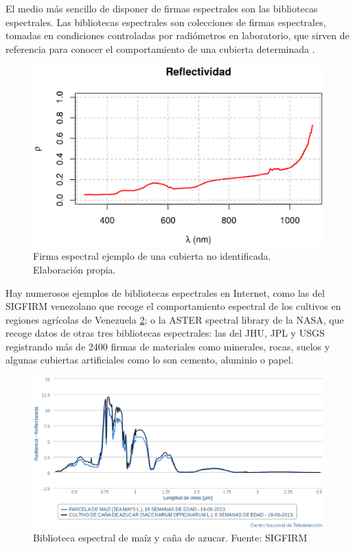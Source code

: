 El medio más sencillo de disponer de firmas espectrales son las bibliotecas espectrales. Las bibliotecas espectrales son colecciones de firmas espectrales, tomadas en condiciones controladas por radiómetros en laboratorio, que sirven de referencia para conocer el comportamiento de una cubierta determinada \citep{andinofase1}.

\begin{figure}
	\centering	
	\includegraphics[width=0.7\linewidth]{./Imagenes/Firma_espectral.eps}
	\caption[Firma espectral ejemplo]{Firma espectral ejemplo de una cubierta no identificada. Elaboración propia.}
	\label{fig:firma}
\end{figure}

Hay numerosos ejemplos de bibliotecas espectrales en Internet, como las del \ac{SIGFIRM} venezolano que recoge el comportamiento espectral de los cultivos en regiones agrícolas de Venezuela \ref{fig:biblioteca_esp}; o la ASTER spectral library de la NASA, que recoge datos de otras tres bibliotecas espectrales: las del \ac{JHU}, \ac{JPL} y \ac{USGS} registrando más de 2400 firmas de materiales como minerales, rocas, suelos y algunas cubiertas artificiales como lo son cemento, aluminio o papel.%

\begin{figure}
	\centering
	\includegraphics[width=0.7\linewidth]{./Imagenes/biblioteca_espectral_SIGFIRM.eps}
	\caption[Biblioteca espectral SIGFIRM]{Biblioteca espectral de maíz y caña de azucar. Fuente: \ac{SIGFIRM}}
	\label{fig:biblioteca_esp}
\end{figure}

